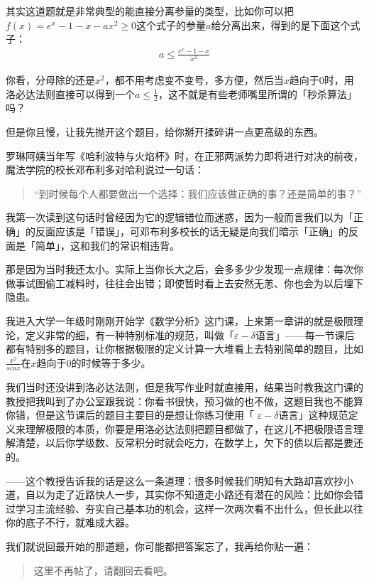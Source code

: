 其实这道题就是非常典型的能直接分离参量的类型，比如你可以把$f(x)=e^x-1-x-ax^2\ge0$这个式子的参量$a$给分离出来，得到的是下面这个式子：
\begin{align*}
  a\le\frac{e^x-1-x}{x^2}
\end{align*}

你看，分母除的还是$x^2$，都不用考虑变不变号，多方便，然后当$x$趋向于0时，用洛必达法则直接可以得到一个$a\leq\frac{1}{2}$，这不就是有些老师嘴里所谓的「秒杀算法」吗？

但是你且慢，让我先抛开这个题目，给你掰开揉碎讲一点更高级的东西。


罗琳阿姨当年写《哈利波特与火焰杯》时，在正邪两派势力即将进行对决的前夜，魔法学院的校长邓布利多对哈利说过一句话：

\begin{quotation}
  “到时候每个人都要做出一个选择：我们应该做正确的事？还是简单的事？”
\end{quotation}

我第一次读到这句话时曾经因为它的逻辑错位而迷惑，因为一般而言我们以为「正确」的反面应该是「错误」，可邓布利多校长的话无疑是向我们暗示「正确」的反面是「简单」，这和我们的常识相违背。

那是因为当时我还太小。实际上当你长大之后，会多多少少发现一点规律：每次你做事试图偷工减料时，往往会出错；即使暂时看上去安然无恙、你也会为以后埋下隐患。

我进入大学一年级时刚刚开始学《数学分析》这门课，上来第一章讲的就是极限理论，定义非常的细，有一种特别标准的规范，叫做「$\varepsilon- \delta$语言」——每一节课后都有特别多的题目，让你根据极限的定义计算一大堆看上去特别简单的题目，比如$\frac{x^2}{sinx}$在$x$趋向于0的时候等于多少。

我们当时还没讲到洛必达法则，但是我写作业时就直接用，结果当时教我这门课的教授把我叫到了办公室跟我说：你看书很快，预习做的也不做，这题目我也不能算你错，但是这节课后的题目主要目的是想让你练习使用「 $\varepsilon- \delta$语言」这种规范定义来理解极限的本质，你要是用洛必达法则把题目都做了，在这儿不把极限语言理解清楚，以后你学级数、反常积分时就会吃力，在数学上，欠下的债以后都是要还的。

——这个教授告诉我的话是这么一条道理：很多时候我们明知有大路却喜欢抄小道，自以为走了近路快人一步，其实你不知道走小路还有潜在的风险：比如你会错过学习主流经验、夯实自己基本功的机会，这样一次两次看不出什么，但长此以往你的底子不行，就难成大器。

我们就说回最开始的那道题，你可能都把答案忘了，我再给你贴一遍：
\begin{quote}
  这里不再帖了，请翻回去看吧。
\end{quote}

